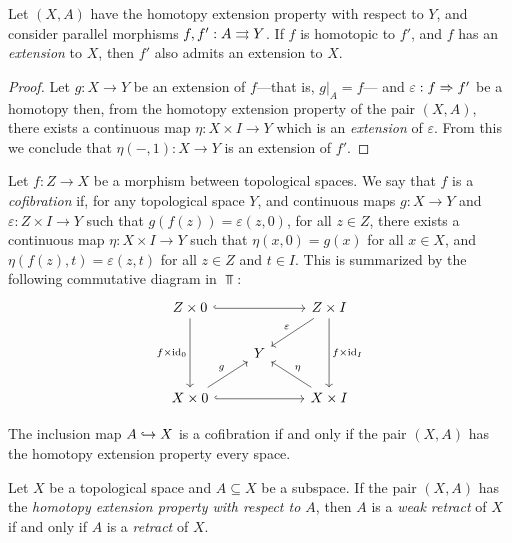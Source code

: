 \begin{corollary}
    \label{cor:homotopic-extension-property}
    Let \((X, A)\) have the homotopy extension property with respect to \(Y\), and
    consider parallel morphisms \(f, f': A \rightrightarrows Y\). If \(f\) is homotopic to
    \(f'\), and \(f\) has an \emph{extension} to \(X\), then \(f'\) also admits an
    extension to \(X\).
\end{corollary}

\begin{proof}
    Let \(g: X \to Y\) be an extension of \(f\)---that is, \(g|_A = f\)--- and
    \(\varepsilon: f \Rightarrow f'\) be a homotopy then, from the homotopy extension
    property of the pair \((X, A)\), there exists a continuous map
    \(\eta: X \times I \to Y\) which is an \emph{extension} of
    \(\varepsilon\). From this we conclude that \(\eta(-, 1): X \to Y\) is an
    extension of \(f'\).
\end{proof}

\begin{definition}[Cofibration]
    \label{def:cofibration}
    Let \(f: Z \to X\) be a morphism between topological spaces. We say that \(f\)
    is a \emph{cofibration} if, for any topological space \(Y\), and continuous maps
    \(g: X \to Y\) and \(\varepsilon: Z \times I \to Y\) such that
    \(g(f(z)) = \varepsilon(z, 0)\), for all \(z \in Z\), there exists a continuous
    map \(\eta: X \times I \to Y\) such that \(\eta(x, 0) = g(x)\) for all
    \(x \in X\), and \(\eta(f(z), t) = \varepsilon(z, t)\) for all \(z \in Z\) and
    \(t \in I\). This is summarized by the following commutative diagram in
    \(\Top\):
    \[
        \begin{tikzcd}
            Z \times 0 \ar[rr, hook] \ar[dd, "f \times \Id_0"']
            & &Z \times I \ar[dd, "f \times \Id_I"] \ar[ld, "\varepsilon"'] \\
            &Y & \\
            X \times 0 \ar[rr, hook] \ar[ru, "g"]
            & &X \times I \ar[lu, "\eta"']
        \end{tikzcd}
    \]
\end{definition}

\begin{example}
    \label{exp:inclusion-cofibration}
    The inclusion map \(A \hookrightarrow X\) is a cofibration if and only if the pair
    \((X, A)\) has the homotopy extension property every space.
\end{example}

\begin{theorem}
    \label{thm:weak-retract-iff-retract}
    Let \(X\) be a topological space and \(A \subseteq X\) be a subspace. If the
    pair \((X, A)\) has the \emph{homotopy extension property with respect to
        \(A\)}, then \(A\) is a \emph{weak retract} of \(X\) if and only if \(A\) is a
    \emph{retract} of \(X\).
\end{theorem}

